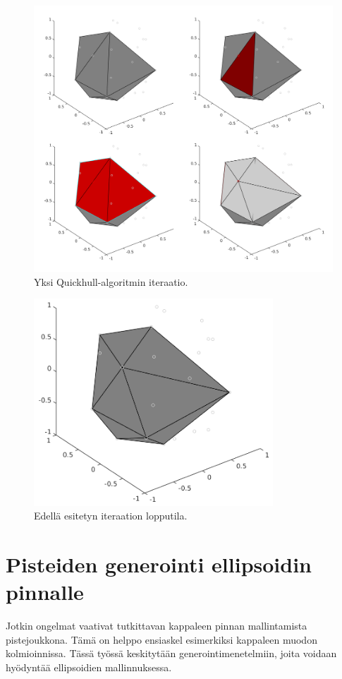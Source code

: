 \documentclass[12pt,a4paper,titlepage]{article}
\begin{document}
\begin{figure}
  \centering
  \includegraphics[width=\textwidth]{kuvat/quickhull-iteraatio.png}
  \caption{Yksi Quickhull-algoritmin iteraatio.}
  \label{quickhull-iteraatio}
\end{figure}

\begin{figure}
  \centering
  \includegraphics[width=0.8\textwidth]{kuvat/iteraatio-lopputila.png}
  \caption{Edellä esitetyn iteraation lopputila.}
  \label{iteraatio-lopputila}
\end{figure}

\section{Pisteiden generointi ellipsoidin pinnalle}
Jotkin ongelmat vaativat tutkittavan kappaleen pinnan mallintamista pistejoukkona. Tämä on helppo ensiaskel esimerkiksi kappaleen muodon kolmioinnissa. Tässä työssä keskitytään generointimenetelmiin, joita voidaan hyödyntää ellipsoidien mallinnuksessa.
\end{document}
